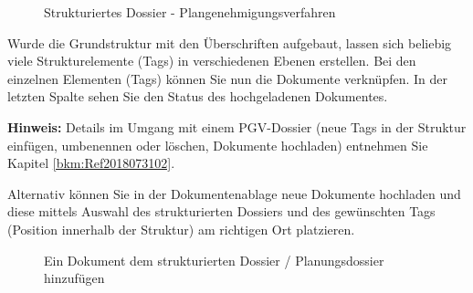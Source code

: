 \begin{figure}[H]
  \vspace{-5pt}
\caption{Strukturiertes Dossier - Plangenehmigungsverfahren}
\end{figure}

Wurde die Grundstruktur mit den Überschriften  aufgebaut, lassen sich beliebig viele Strukturelemente (Tags)  in verschiedenen Ebenen erstellen. Bei den einzelnen Elementen (Tags) können Sie nun die Dokumente verknüpfen. In der letzten Spalte sehen Sie den Status des hochgeladenen Dokumentes.

\vspace{\baselineskip}

\textbf{Hinweis:} Details im Umgang mit einem PGV-Dossier (neue Tags in der Struktur einfügen, umbenennen oder löschen, Dokumente hochladen) entnehmen Sie Kapitel \ref{bkm:Ref2018073102}.

\vspace{\baselineskip}

Alternativ können Sie in der Dokumentenablage neue Dokumente hochladen und diese mittels Auswahl des strukturierten Dossiers und des gewünschten Tags (Position innerhalb der Struktur) am richtigen Ort platzieren.

\begin{figure}[H]
\caption{Ein Dokument dem strukturierten Dossier / Planungsdossier hinzufügen}
\end{figure}


